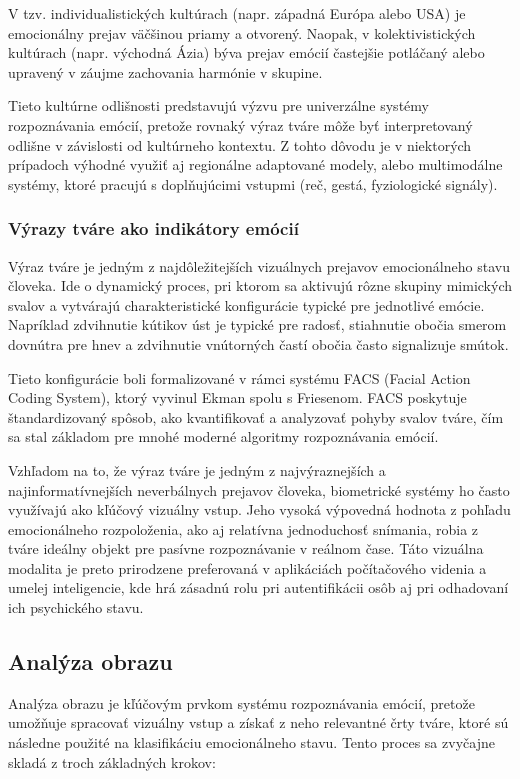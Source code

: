 V tzv. individualistických kultúrach (napr. západná Európa alebo USA) je emocionálny prejav väčšinou priamy a otvorený. Naopak, v kolektivistických kultúrach (napr. východná Ázia) býva prejav emócií častejšie potláčaný alebo upravený v 
záujme zachovania harmónie v skupine.

Tieto kultúrne odlišnosti predstavujú výzvu pre univerzálne systémy rozpoznávania emócií, pretože rovnaký výraz tváre môže byť interpretovaný odlišne v závislosti od kultúrneho kontextu. Z tohto dôvodu je v niektorých prípadoch výhodné využiť aj regionálne 
adaptované modely, alebo multimodálne systémy, ktoré pracujú s doplňujúcimi vstupmi (reč, gestá, fyziologické signály).

\subsubsection{Výrazy tváre ako indikátory emócií}
Výraz tváre je jedným z najdôležitejších vizuálnych prejavov emocionálneho stavu človeka. Ide o dynamický proces, pri ktorom sa aktivujú rôzne skupiny mimických svalov a vytvárajú charakteristické konfigurácie typické pre jednotlivé emócie. Napríklad zdvihnutie kútikov úst je typické pre radosť, stiahnutie obočia smerom dovnútra pre hnev a zdvihnutie vnútorných častí obočia často signalizuje smútok.

Tieto konfigurácie boli formalizované v rámci systému FACS (Facial Action Coding System), ktorý vyvinul Ekman spolu s Friesenom. 
FACS poskytuje štandardizovaný spôsob, ako kvantifikovať a analyzovať pohyby svalov tváre, čím sa stal základom pre mnohé moderné algoritmy rozpoznávania emócií. \cite{ekman1978facs}

Vzhľadom na to, že výraz tváre je jedným z najvýraznejších a najinformatívnejších neverbálnych prejavov človeka, biometrické systémy ho často využívajú ako kľúčový vizuálny vstup. Jeho vysoká výpovedná hodnota z pohľadu emocionálneho rozpoloženia, ako aj relatívna jednoduchosť snímania, robia z tváre ideálny objekt pre pasívne rozpoznávanie v reálnom čase. 
Táto vizuálna modalita je preto prirodzene preferovaná v aplikáciách počítačového videnia a umelej inteligencie, kde hrá zásadnú rolu pri autentifikácii osôb aj pri odhadovaní ich psychického stavu.

\subsection{Analýza obrazu}
Analýza obrazu je kľúčovým prvkom systému rozpoznávania emócií, pretože umožňuje spracovať vizuálny vstup a získať z neho relevantné črty tváre, ktoré sú následne použité na klasifikáciu emocionálneho stavu. Tento proces sa zvyčajne skladá z troch základných krokov:

